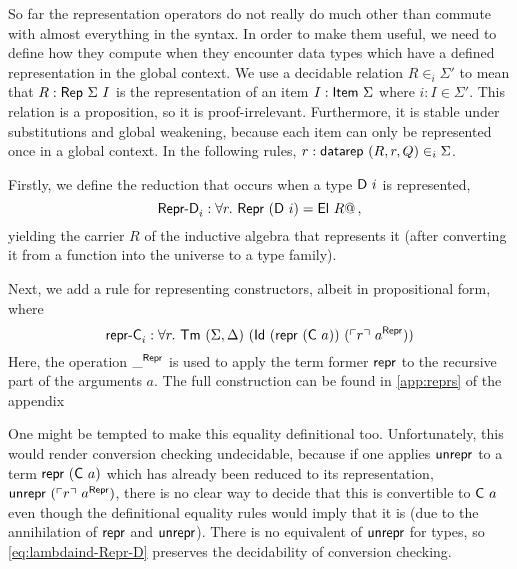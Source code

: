 So far the representation operators do not really do much other than commute
with almost everything in the syntax. In order to make
them useful, we need to define how they compute when they encounter data types
which have a defined representation in the global context.
We use a decidable relation $R \in_i \Sigma'$ to mean that $R :
\textsf{Rep}\ \Sigma\ I$ is the representation of an item $I : \textsf{Item}\ \Sigma$
where $i : I \in \Sigma'$.
This relation is a proposition, so it is proof-irrelevant. Furthermore, it is stable under
substitutions and global weakening, because each item can only be represented once in a global context.
In the following rules, $r : \textsf{datarep}\ (R, r, Q) \in_i \Sigma$.

Firstly, we define the reduction that occurs when a type $\textsf{D}\ i$ is represented,
\begin{equation}
  \textsf{Repr-D}_i : \forall r.\ \textsf{Repr}\ (\textsf{D}\ i) = \textsf{El}\ R@ \,, \label{eq:lambdaind-Repr-D}
\end{equation}
yielding the carrier $R$ of the inductive algebra that represents it (after
converting it from a function into the universe to a type family).

Next, we add a rule for representing constructors, albeit in propositional form, where
\begin{equation}
\mta{repr-C}_i : \forall r.\ \Tm\ (\Sigma, \Delta)\ (\mta{Id}\ (\Mrepr\ (\mta{C}\ a))\ (\emb{r}\ a^\mta{Repr}))  \label{eq:repr-ci}
\end{equation}
Here, the operation $\_^{\textsf{Repr}}$ is used to apply the term former
$\textsf{repr}$ to the recursive part of the arguments $a$. The full construction
can be found in \cref{app:reprs} of the appendix

One might be tempted to make this equality definitional too. Unfortunately, this
would render conversion checking undecidable, because if one applies
$\textsf{unrepr}$ to a term $\textsf{repr}\ (\textsf{C}\ a)$ which has already been reduced
to its representation, $\textsf{unrepr}\ (\ulcorner r \urcorner\ a^{\textsf{Repr}})$, there is no
clear way to decide that this is convertible to $\textsf{C}\ a$ even though the
definitional equality rules would imply that it is (due
to the annihilation of $\textsf{repr}$ and $\textsf{unrepr}$). There is no
equivalent of $\textsf{unrepr}$ for types, so \eqref{eq:lambdaind-Repr-D} preserves
the decidability of conversion checking.


